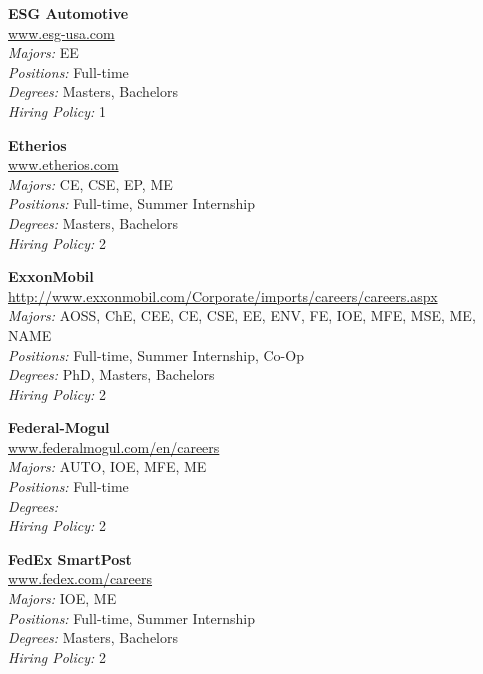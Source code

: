 \documentclass[twoside]{article}
\begin{document}
\begin{center}
\begin{multicols}{3}
\begin{minipage}{.9\columnwidth}{\Large\bf ESG Automotive }\\
	\url{www.esg-usa.com}\\
	\emph{Majors:} EE\\
	\emph{Positions:} Full-time\\
	\emph{Degrees:} Masters, Bachelors\\
	\emph{Hiring Policy:} 1\\
\end{minipage}
 
\begin{minipage}{.9\columnwidth}{\Large\bf Etherios }\\
	\url{www.etherios.com}\\
	\emph{Majors:} CE, CSE, EP, ME\\
	\emph{Positions:} Full-time, Summer Internship\\
	\emph{Degrees:} Masters, Bachelors\\
	\emph{Hiring Policy:} 2\\
\end{minipage}
 
\begin{minipage}{.9\columnwidth}{\Large\bf ExxonMobil }\\
	\url{http://www.exxonmobil.com/Corporate/imports/careers/careers.aspx}\\
	\emph{Majors:} AOSS, ChE, CEE, CE, CSE, EE, ENV, FE, IOE, MFE, MSE, ME, NAME\\
	\emph{Positions:} Full-time, Summer Internship, Co-Op\\
	\emph{Degrees:} PhD, Masters, Bachelors\\
	\emph{Hiring Policy:} 2\\
\end{minipage}
 
\begin{minipage}{.9\columnwidth}{\Large\bf Federal-Mogul }\\
	\url{www.federalmogul.com/en/careers}\\
	\emph{Majors:} AUTO, IOE, MFE, ME\\
	\emph{Positions:} Full-time\\
	\emph{Degrees:} \\
	\emph{Hiring Policy:} 2\\
\end{minipage}
 
\begin{minipage}{.9\columnwidth}{\Large\bf FedEx SmartPost }\\
	\url{www.fedex.com/careers}\\
	\emph{Majors:} IOE, ME\\
	\emph{Positions:} Full-time, Summer Internship\\
	\emph{Degrees:} Masters, Bachelors\\
	\emph{Hiring Policy:} 2\\
\end{minipage}
 

\end{multicols}
\end{center}
\end{document}
